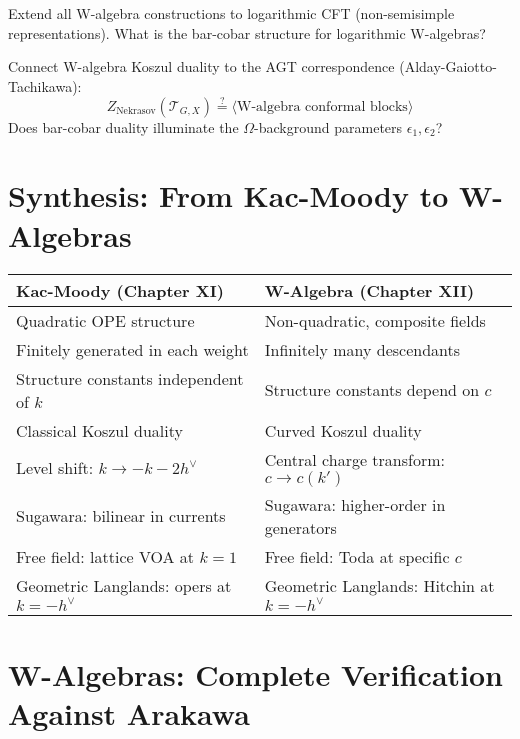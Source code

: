 \begin{openproblem}[5]
Extend all W-algebra constructions to logarithmic CFT (non-semisimple representations). What is the bar-cobar structure for logarithmic W-algebras?
\end{openproblem}

\begin{openproblem}[6]
Connect W-algebra Koszul duality to the AGT correspondence (Alday-Gaiotto-Tachikawa):
$$Z_{\text{Nekrasov}}(\mathcal{T}_{G,X}) \overset{?}{=} \langle \text{W-algebra conformal blocks} \rangle$$
Does bar-cobar duality illuminate the $\Omega$-background parameters $\epsilon_1, \epsilon_2$?
\end{openproblem}

\section{Synthesis: From Kac-Moody to W-Algebras}

\begin{center}
\begin{tabular}{|p{5cm}|p{5cm}|}
\hline
\textbf{Kac-Moody (Chapter XI)} & \textbf{W-Algebra (Chapter XII)} \\
\hline
Quadratic OPE structure & Non-quadratic, composite fields \\
\hline
Finitely generated in each weight & Infinitely many descendants \\
\hline
Structure constants independent of $k$ & Structure constants depend on $c$ \\
\hline
Classical Koszul duality & Curved Koszul duality \\
\hline
Level shift: $k \to -k-2h^\vee$ & Central charge transform: $c \to c(k')$ \\
\hline
Sugawara: bilinear in currents & Sugawara: higher-order in generators \\
\hline
Free field: lattice VOA at $k=1$ & Free field: Toda at specific $c$ \\
\hline
Geometric Langlands: opers at $k=-h^\vee$ & Geometric Langlands: Hitchin at $k=-h^\vee$ \\
\hline
\end{tabular}
\end{center}

\section{W-Algebras: Complete Verification Against Arakawa}
\label{sec:w-algebras-arakawa-verification-complete}


